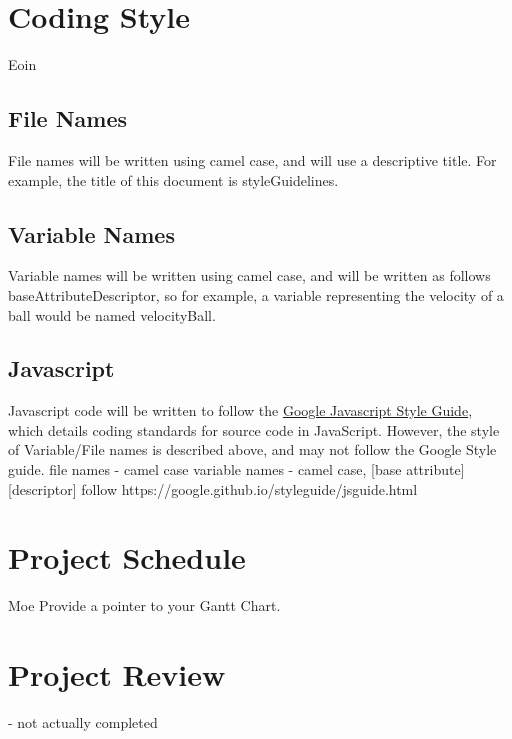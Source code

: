 \documentclass{article}
\begin{document}
\section{Coding Style}
Eoin
\subsection{File Names}
File names will be written using camel case, and will use a descriptive title. For example, the title of this document is styleGuidelines.
\subsection{Variable Names}
Variable names will be written using camel case, and will be written as follows baseAttributeDescriptor, so for example, a variable representing the velocity of a ball would be named velocityBall.
\subsection{Javascript}
Javascript code will be written to follow the \href{https://google.github.io/styleguide/jsguide.html}{Google Javascript Style Guide}, which details coding standards for source code in JavaScript. However, the style of Variable/File names is described above, and may not follow the Google Style guide.
file names - camel case
variable names - camel case, [base attribute][descriptor]
follow https://google.github.io/styleguide/jsguide.html

\section{Project Schedule}
Moe
Provide a pointer to your Gantt Chart.

\section{Project Review}

- not actually completed
\end{document}
